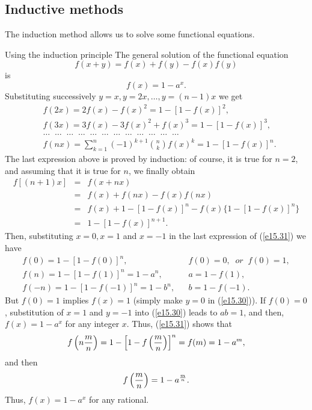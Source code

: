 \documentclass[
	11pt, %
	fleqn, %
	a4paper, %
]{LegrandOrangeBook}
\begin{document}
\subsection{Inductive methods} \label{s2.7}
The induction method allows us to solve some functional equations.
\begin{example}{Using the induction principle} The general solution of the functional equation
\begin{equation}\label{e15.30}
f(x+y)=f(x)+f(y)-f(x)f(y)
\end {equation}
is
\begin{displaymath}
f(x)=1-a^x.
\end{displaymath}
 Substituting successively $y=x, y=2x ,\dots
, y=(n-1)x$ we get
\begin{equation}\label{e15.31}\begin{array}{ll}
&f(2x)=2f(x)-f(x)^2=1-\left[ {1-f(x)} \right]^2,\\
  &f(3x)=3f(x)-3f(x)^2+f(x)^3=1-\left[ {1-f(x)} \right]^3,\\
  & \dots \;\;\dots \;\;\dots\;\; \dots \;\;\dots\;\; \dots
\;\;\dots\;\;\dots \;\;\dots\;\;\dots\;\;\dots
\;\;\dots \\
  &f(nx)=\sum\limits_{k=1}^n {(-1)^{k+1}}\binom{n}{k}f(x)^k=1-\left[ {1-f(x)} \right]^n.
\end{array}
\end {equation}
The last expression above is proved by induction:
of course, it is true for $n=2$, and assuming that it is true for
$n$, we finally obtain
\begin{displaymath}\begin{array}{rll}
f[(n+1)x] &=& f(x+nx)\\
 &=& f(x)+f(nx)-f(x)f(nx)\\
 &=& f(x)+1-[1-f(x)]^n-f(x)\{1-[1-f(x)]^n\}\\
 &=& 1-[1-f(x)]^{n+1}.
\end{array}
\end{displaymath}
Then, substituting $x=0, x=1$ and $x=-1$ in the last expression of
(\ref{e15.31}) we have
\begin{displaymath}
\begin{array}{lcl}
f(0)=1-[1-f(0)]^n, &  & f(0)=0,\;\; or\;\; f(0)=1, \\
f(n)=1-[1-f(1)]^n=1-a^n, &  & a=1-f(1) ,\\
f(-n)=1-[1-f(-1)]^n=1-b^n, &  & b=1-f(-1).
\end{array}
\end{displaymath}
But $f(0)=1$ implies $f(x)=1$ (simply make $y=0$ in
(\ref{e15.30})). If $f(0)=0$, substitution of $x=1$ and $y=-1$
into (\ref{e15.30}) leads to $ab=1$, and then, $f(x)=1-a^x$ for
any integer $x$. Thus, (\ref{e15.31}) shows that
\begin{displaymath}
f\left(n{m \over n}\right)=1-\left[1-f\left({m \over n}\right)\right]^n=f(m)=1-a^m,
\end{displaymath}
and then
\begin{displaymath}
f\left({m \over n}\right)=1-a^{{m \over n}}.
\end{displaymath}
Thus, $f(x)=1-a^x$ for any rational.


\end{example}
\end{document}
